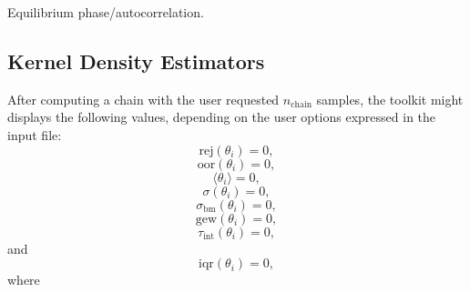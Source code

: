 Equilibrium phase/autocorrelation.

\subsection{Kernel Density Estimators}

After computing a chain with the user requested $n_{\text{chain}}$ samples, the toolkit might displays the following values, depending on the user options expressed in the input file:
\begin{equation}\label{eq-dram-chain-stats-rej}
\text{rej}(\theta_i) = 0,
\end{equation}
%
\begin{equation}\label{eq-dram-chain-stats-oor}
\text{oor}(\theta_i) = 0,
\end{equation}
%
\begin{equation}\label{eq-dram-chain-stats-mean}
\langle\theta_i\rangle = 0,
\end{equation}
%
\begin{equation}\label{eq-dram-chain-stats-std}
\sigma(\theta_i) = 0,
\end{equation}
%
\begin{equation}\label{eq-dram-chain-stats-bm}
\sigma_{\text{bm}}(\theta_i) = 0,
\end{equation}
%
\begin{equation}\label{eq-dram-chain-stats-gew}
\text{gew}(\theta_i) = 0,
\end{equation}
\begin{equation}\label{eq-dram-chain-stats-tau-int}
\tau_{\text{int}}(\theta_i) = 0,
\end{equation}
and
\begin{equation}\label{eq-dram-chain-stats-iqr}
\text{iqr}(\theta_i) = 0,
\end{equation}
where


